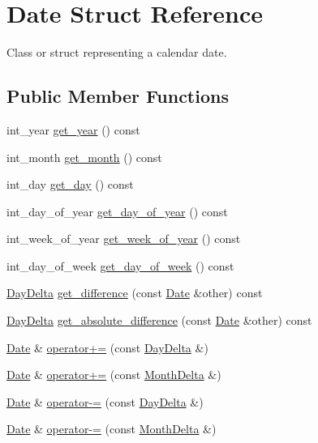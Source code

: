 \hypertarget{structDate}{\section{\-Date \-Struct \-Reference}
\label{structDate}
}


\-Class or struct representing a calendar date.  


\subsection*{\-Public \-Member \-Functions}
\begin{DoxyCompactItemize}
\item 
int\-\_\-year \hyperlink{structDate_a970cb8375d137e19cea4c042a0b8d64a}{get\-\_\-year} () const 
\item 
int\-\_\-month \hyperlink{structDate_afa1025e5868c30b20b1ff1481e30f08d}{get\-\_\-month} () const 
\item 
int\-\_\-day \hyperlink{structDate_a044d6531a4335e3136f7aedd67fc0db0}{get\-\_\-day} () const 
\item 
int\-\_\-day\-\_\-of\-\_\-year \hyperlink{structDate_af19ad4f968f7799a336d2112c784bc9b}{get\-\_\-day\-\_\-of\-\_\-year} () const 
\item 
int\-\_\-week\-\_\-of\-\_\-year \hyperlink{structDate_acd84e3844957e82014a2c17bb45bcce3}{get\-\_\-week\-\_\-of\-\_\-year} () const 
\item 
int\-\_\-day\-\_\-of\-\_\-week \hyperlink{structDate_ad5ff9ecae53c65ba2b45dc4f69f37d5c}{get\-\_\-day\-\_\-of\-\_\-week} () const 
\item 
\hyperlink{structDayDelta}{\-Day\-Delta} \hyperlink{structDate_ae175df5ffb7f12378d41453209994e59}{get\-\_\-difference} (const \hyperlink{structDate}{\-Date} \&other) const 
\item 
\hyperlink{structDayDelta}{\-Day\-Delta} \hyperlink{structDate_a293adccbbf2f42bd54dde9fb0de81f92}{get\-\_\-absolute\-\_\-difference} (const \hyperlink{structDate}{\-Date} \&other) const 
\item 
\hyperlink{structDate}{\-Date} \& \hyperlink{structDate_a0a5674bd1757acf8b229a8448c200bf7}{operator+=} (const \hyperlink{structDayDelta}{\-Day\-Delta} \&)
\item 
\hyperlink{structDate}{\-Date} \& \hyperlink{structDate_ad5a2f681fdc34cbff1511fd7e6dd6f91}{operator+=} (const \hyperlink{structMonthDelta}{\-Month\-Delta} \&)
\item 
\hyperlink{structDate}{\-Date} \& \hyperlink{structDate_a43159e68f1bceedbb169931b85feeee8}{operator-\/=} (const \hyperlink{structDayDelta}{\-Day\-Delta} \&)
\item 
\hyperlink{structDate}{\-Date} \& \hyperlink{structDate_ac7b9e1798bc482f9847d6f87921e4975}{operator-\/=} (const \hyperlink{structMonthDelta}{\-Month\-Delta} \&)
\end{DoxyCompactItemize}

